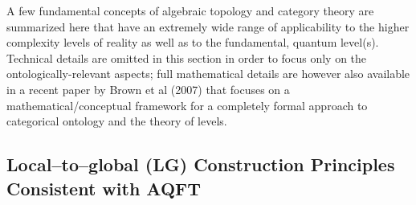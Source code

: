 \documentclass[12pt]{article}
\theoremstyle{plain}
\theoremstyle{definition}
\theoremstyle{plain}
\numberwithin{equation}{section}
\begin{document}
 A few fundamental concepts of algebraic topology and category theory 
are summarized here that have an extremely wide range of applicability to the higher complexity levels of reality as well as to the fundamental, quantum level(s). Technical details are omitted in this section in order to focus only on the ontologically-relevant aspects; full mathematical details are however also available in a recent paper by Brown et al (2007) that focuses on a mathematical/conceptual framework for a completely formal approach to categorical ontology and the theory of levels.

\subsection{Local--to--global (LG) Construction Principles Consistent with AQFT}
\end{document}
